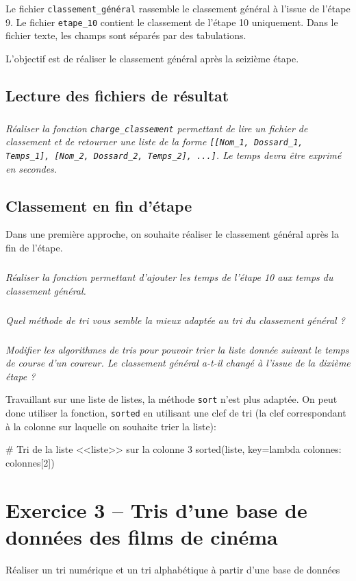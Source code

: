 Le fichier \texttt{classement\_général} rassemble le classement général à l'issue de l'étape 9. Le fichier \texttt{etape\_10} contient le classement de l'étape 10 uniquement. Dans le fichier texte, les champs sont séparés par des tabulations.


\begin{obj}
L'objectif est de réaliser le classement général après la seizième étape. 
\end{obj}

\subsection*{Lecture des fichiers de résultat}
\setcounter{exo}{0}
\subparagraph{}
\textit{Réaliser la fonction \texttt{charge\_classement} permettant de lire un fichier de classement 
et de retourner une liste de la forme \texttt{[[Nom\_1, Dossard\_1, Temps\_1], [Nom\_2, Dossard\_2, Temps\_2], ...]}. Le temps devra être exprimé en secondes.}



\subsection*{Classement en fin d'étape}
Dans une première approche, on souhaite réaliser le classement général après la fin de l'étape. 

\subparagraph{}
\textit{Réaliser la fonction permettant d'ajouter les temps de l'étape 10 aux temps du classement général.}

\subparagraph{}
\textit{Quel méthode de tri vous semble la mieux adaptée au tri du classement général ?}

\subparagraph{}
\textit{Modifier les algorithmes de tris pour pouvoir trier la liste donnée suivant le temps de course d'un coureur. Le classement général a-t-il changé à l'issue de la dixième étape ?}

\begin{rem}
Travaillant sur une liste de listes, la méthode \texttt{sort} n'est plus adaptée. On peut donc utiliser la fonction, \texttt{sorted} en utilisant une clef de tri (la clef correspondant à la colonne sur laquelle on souhaite trier la liste): 
\end{rem}
\begin{python}
# Tri de la liste <<liste>> sur la colonne 3
sorted(liste, key=lambda colonnes: colonnes[2])
\end{python}


\section*{Exercice 3 -- Tris d'une base de données des films de cinéma}
\setcounter{exo}{0}
\begin{obj}
Réaliser un tri numérique et un tri alphabétique à partir d'une base de données
\end{obj}

